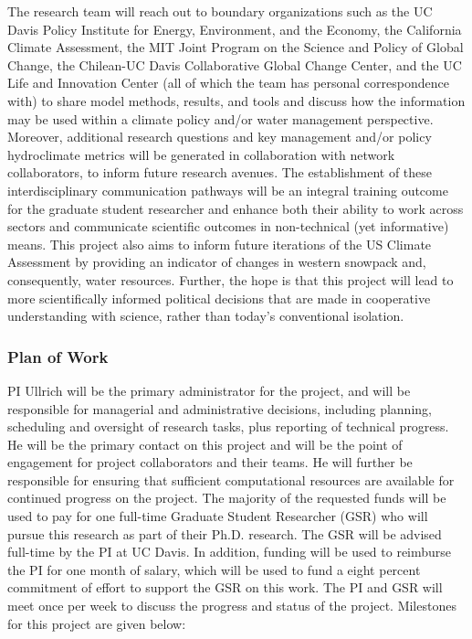 \documentclass[11pt]{article}
\begin{document}
The research team will reach out to boundary organizations such as the UC Davis Policy Institute for Energy, Environment, and the Economy, the California Climate Assessment, the MIT Joint Program on the Science and Policy of Global Change, the Chilean-UC Davis Collaborative Global Change Center, and the UC Life and Innovation Center (all of which the team has personal correspondence with) to share model methods, results, and tools and discuss how the information may be used within a climate policy and/or water management perspective.  Moreover, additional research questions and key management and/or policy hydroclimate metrics will be generated in collaboration with network collaborators, to inform future research avenues.  The establishment of these interdisciplinary communication pathways will be an integral training outcome for the graduate student researcher and enhance both their ability to work across sectors and communicate scientific outcomes in non-technical (yet informative) means.  This project also aims to inform future iterations of the US Climate Assessment by providing an indicator of changes in western snowpack and, consequently, water resources.  Further, the hope is that this project will lead to more scientifically informed political decisions that are made in cooperative understanding with science, rather than today's conventional isolation.


\subsubsection{Plan of Work}

PI Ullrich will be the primary administrator for the project, and will be responsible for managerial and administrative decisions, including planning, scheduling and oversight of research tasks, plus reporting of technical progress. He will be the primary contact on this project and will be the point of engagement for project collaborators and their teams. He will further be responsible for ensuring that sufficient computational resources are available for continued progress on the project. The majority of the requested funds will be used to pay for one full-time Graduate Student Researcher (GSR) who will pursue this research as part of their Ph.D. research. The GSR will be advised full-time by the PI at UC Davis. In addition, funding will be used to reimburse the PI for one month of salary, which will be used to fund a eight percent commitment of effort to support the GSR on this work. The PI and GSR will meet once per week to discuss the progress and status of the project. Milestones for this project are given below:
\end{document}
